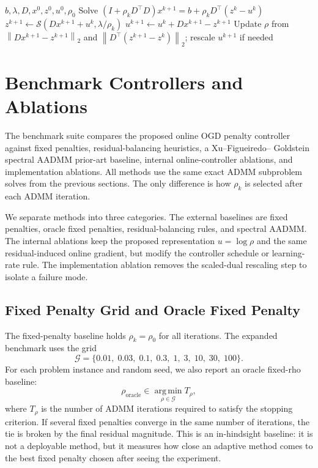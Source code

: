 \documentclass[11pt]{article}
\newcommand{\argmin}{\operatorname*{arg\,min}}
\newcommand{\shrink}{\mathcal{S}}
\newcommand{\norm}[1]{\left\lVert #1 \right\rVert}
\begin{document}
\begin{algorithm}[t]
\caption{One-dimensional TV denoising ADMM with online $\rho$}
\label{alg:tv}
\begin{algorithmic}[1]
\Require $b,\lambda,D,x^0,z^0,u^0,\rho_0$
    \State Solve $(I+\rho_kD^\top D)x^{k+1}=b+\rho_kD^\top(z^k-u^k)$
    \State $z^{k+1}\gets\shrink(Dx^{k+1}+u^k,\lambda/\rho_k)$
    \State $u^{k+1}\gets u^k+Dx^{k+1}-z^{k+1}$
    \State Update $\rho$ from $\norm{Dx^{k+1}-z^{k+1}}_2$ and
           $\norm{D^\top(z^{k+1}-z^k)}_2$; rescale $u^{k+1}$ if needed
\EndFor
\end{algorithmic}
\end{algorithm}

\section{Benchmark Controllers and Ablations}

The benchmark suite compares the proposed online OGD penalty controller
against fixed penalties, residual-balancing heuristics, a Xu--Figueiredo--
Goldstein spectral AADMM prior-art baseline, internal online-controller
ablations, and implementation ablations.  All methods use the
same exact ADMM subproblem solves from the previous sections.  The only
difference is how $\rho_k$ is selected after each ADMM iteration.

We separate methods into three categories.  The external baselines are fixed
penalties, oracle fixed penalties, residual-balancing rules, and spectral
AADMM.  The internal ablations keep the proposed representation
$u=\log\rho$ and the same residual-induced online gradient, but modify the
controller schedule or learning-rate rule.  The implementation ablation removes
the scaled-dual rescaling step to isolate a failure mode.

\subsection{Fixed Penalty Grid and Oracle Fixed Penalty}

The fixed-penalty baseline holds $\rho_k=\rho_0$ for all iterations.  The
expanded benchmark uses the grid
\begin{equation}
    \mathcal{G}
    =
    \{0.01,\;0.03,\;0.1,\;0.3,\;1,\;3,\;10,\;30,\;100\}.
\end{equation}
For each problem instance and random seed, we also report an oracle fixed-rho
baseline:
\begin{equation}
    \rho_{\mathrm{oracle}}
    \in
    \argmin_{\rho\in\mathcal{G}}
    T_{\rho},
\end{equation}
where $T_{\rho}$ is the number of ADMM iterations required to satisfy the
stopping criterion.  If several fixed penalties converge in the same number of
iterations, the tie is broken by the final residual magnitude.  This is an
in-hindsight baseline: it is not a deployable method, but it measures how close
an adaptive method comes to the best fixed penalty chosen after seeing the
experiment.
\end{document}
